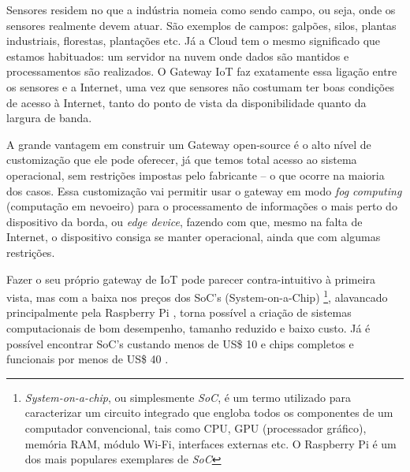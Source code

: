 Sensores residem no que a indústria nomeia como sendo campo, ou seja, onde os sensores realmente devem atuar. São exemplos de campos: galpões, silos, plantas industriais, florestas, plantações etc. Já a Cloud tem o mesmo significado que estamos habituados: um servidor na nuvem onde dados são mantidos e processamentos são realizados. O Gateway IoT faz exatamente essa ligação entre os sensores e a Internet, uma vez que sensores não costumam ter boas condições de acesso à Internet, tanto do ponto de vista da disponibilidade quanto da largura de banda.

A grande vantagem em construir um Gateway open-source é o alto nível de customização que ele pode oferecer, já que temos total acesso ao sistema operacional, sem restrições impostas pelo fabricante – o que ocorre na maioria dos casos. Essa customização vai permitir usar o gateway em modo \textit{fog computing} (computação em nevoeiro) para o processamento de informações o mais perto do dispositivo da borda, ou \textit{edge device}, fazendo com que, mesmo na falta de Internet, o dispositivo consiga se manter operacional, ainda que com algumas restrições.

Fazer o seu próprio gateway de IoT pode parecer contra-intuitivo à primeira vista, mas com a baixa nos preços dos SoC’s (System-on-a-Chip) \footnote{\textit{System-on-a-chip}, ou simplesmente \textit{SoC}, é um termo utilizado para caracterizar um circuito integrado que engloba todos os componentes de um computador convencional, tais como CPU, GPU (processador gráfico), memória RAM, módulo Wi-Fi, interfaces externas etc. O Raspberry Pi é um dos mais populares exemplares de \textit{SoC}}, alavancado principalmente pela Raspberry Pi \cite{RaspberryPi}, torna possível a criação de sistemas computacionais de bom desempenho, tamanho reduzido e baixo custo. Já é possível encontrar SoC’s custando menos de US\$ 10 e chips completos e funcionais por menos de US\$ 40 \cite{RaspberryPiVenda}.